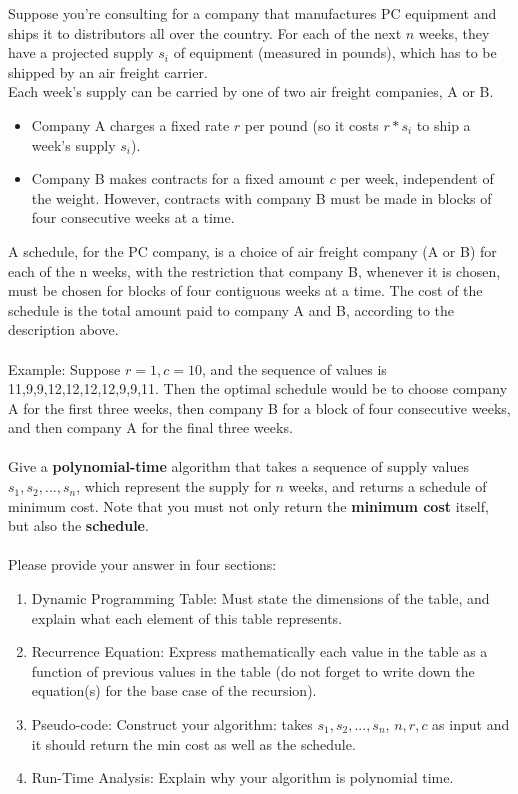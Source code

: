 \documentclass[11pt]{article}
\begin{document}
Suppose you’re consulting for a company that manufactures PC equipment and ships it to distributors all over the country. For each of the next $n$ weeks, they have a projected supply $s_i$ of equipment (measured in pounds), which has to be shipped by an air freight carrier.
\\
Each week’s supply can be carried by one of two air freight companies, A or B.
\begin{itemize}
    \item Company A charges a fixed rate $r$ per pound (so it costs $r*s_i$ to ship a week’s supply $s_i$).
    \item Company B makes contracts for a fixed amount $c$ per week, independent of the weight. However, contracts with company B must be made in blocks of four consecutive weeks at a time.
\end{itemize}
A schedule, for the PC company, is a choice of air freight company (A or B) for each of the n weeks, with the restriction that company B, whenever it is chosen, must be chosen for blocks of four contiguous weeks at a time. The cost of the schedule is the total amount paid to company A and B, according to the description above.
\\ \\
Example: Suppose $r = 1, c = 10$, and the sequence of values is 11,9,9,12,12,12,12,9,9,11. Then the optimal schedule would be to choose company A for the first three weeks, then company B for a block of four consecutive weeks, and then company A for the final three weeks.
\\ \\
Give a \textbf{polynomial-time} algorithm that takes a sequence of supply values $s_1, s_2, . . . , s_n$, which represent the supply for $n$ weeks, and returns a schedule of minimum cost. Note that you must not only return the \textbf{minimum cost} itself, but also the \textbf{schedule}.
\\ \\
Please provide your answer in four sections:
\begin{enumerate}
    \item Dynamic Programming Table: Must state the dimensions of the table, and explain what each element of this table represents.
    \item Recurrence Equation: Express mathematically each value in the table as a function of previous values in the table (do not forget to write down the equation(s) for the base case of the recursion).
    \item Pseudo-code: Construct your algorithm: takes $s_1, s_2, . . . , s_n$, $n, r, c$ as input and it should return the min cost as well as the schedule.
    \item Run-Time Analysis: Explain why your algorithm is polynomial time.
\end{enumerate}
\end{document}
